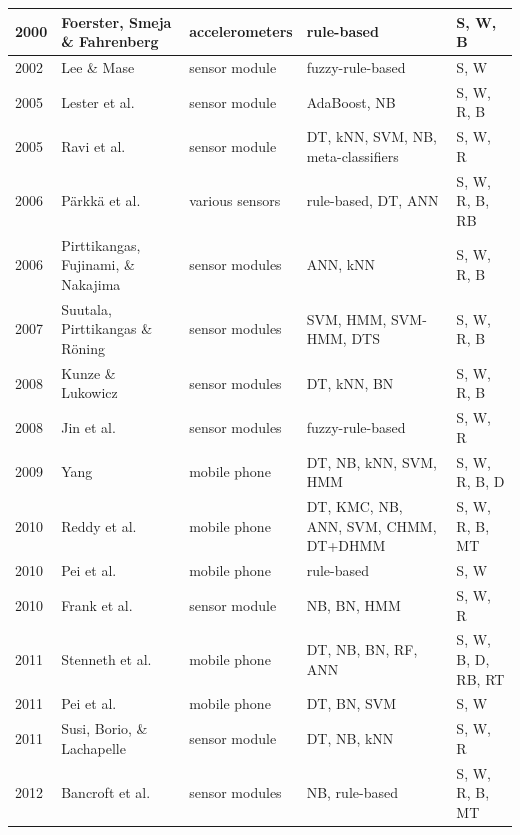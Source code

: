 \begin{center}
\begin{longtable} {|l|>{\raggedright}p{3cm}|p{2.4cm}|>{\centering\arraybackslash}p{2.5cm}|>{\centering\arraybackslash}p{2.2cm}|}
2000 & Foerster, Smeja \& Fahrenberg \cite{foerster2000motion} & accelerometers & rule-based & S, W, B \\ \hline
2002 & Lee \& Mase \cite{lee2002activity} & sensor module & fuzzy-rule-based & S, W \\ \hline
2005 & Lester et al. \cite{lester2005hybrid} & sensor module & AdaBoost, NB & S, W, R, B \\ \hline
2005 & Ravi et al. \cite{Ravi2005} & sensor module & DT, kNN, SVM, NB, meta-classifiers& S, W, R\\ \hline
2006 & P\"{a}rkk\"{a} et al. \cite{parkka2006activity} & various sensors & rule-based, DT, ANN & S, W, R, B, RB \\ \hline
2006 & Pirttikangas, Fujinami, \& Nakajima \cite{pirttikangas2006feature} & sensor modules & ANN, kNN & S, W, R, B \\ \hline
2007 & Suutala, Pirttikangas \& R\"{o}ning \cite{Suutula2007} & sensor modules & SVM, HMM, SVM-HMM, DTS & S, W, R, B \\ \hline
2008 & Kunze \& Lukowicz \cite{kunze2008dealing} & sensor modules & DT, kNN, BN & S, W, R, B \\ \hline
2008 & Jin et al. \cite{yin2008sensor} & sensor modules & fuzzy-rule-based & S, W, R \\ \hline
2009 & Yang \cite{yang2009toward} & mobile phone & DT, NB, kNN, SVM, HMM & S, W, R, B, D \\ \hline
2010 & Reddy et al. \cite{Reddy2010} & mobile phone & DT, KMC, NB, ANN, SVM, CHMM, DT+DHMM & S, W, R, B, MT \\ \hline 
2010 & Pei et al. \cite{Pei2010} & mobile phone & rule-based &  S, W \\ \hline
2010 & Frank et al. \cite{Frank2010}& sensor module & NB, BN, HMM & S, W, R \\ \hline
2011 & Stenneth et al. \cite{Stenneth2011}& mobile phone  & DT, NB, BN, RF, ANN & S, W, B, D, RB, RT \\ \hline
2011 & Pei et al. \cite{pei2011using} & mobile phone & DT, BN, SVM & S, W \\ \hline
2011 & Susi, Borio, \& Lachapelle \cite{susi2011accelerometer} & sensor module & DT, NB, kNN & S, W, R\\ \hline
2012 & Bancroft et al. \cite{Bancroft2012}& sensor modules & NB, rule-based & S, W, R, B, MT\\ \hline

\end{longtable}
\end{center}
